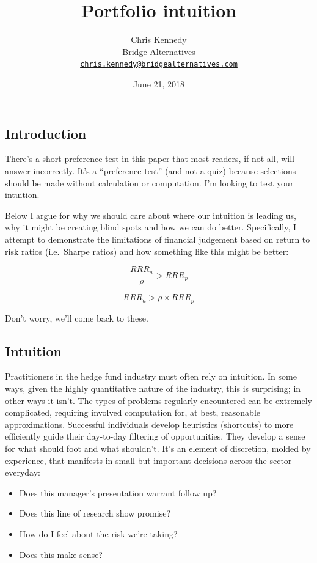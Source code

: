 \documentclass[]{article}
\title{Portfolio intuition}
\author{Chris Kennedy\\
Bridge Alternatives\\
\href{mailto:chris.kennedy@bridgealternatives.com}{\nolinkurl{chris.kennedy@bridgealternatives.com}}}
\date{June 21, 2018}
\providecommand{\tightlist}{%
  \setlength{\itemsep}{0pt}\setlength{\parskip}{0pt}}
\begin{document}
\maketitle

\hypertarget{introduction}{%
\subsection{Introduction}\label{introduction}}

There's a short preference test in this paper that most readers, if not
all, will answer incorrectly. It's a ``preference test'' (and not a
quiz) because selections should be made without calculation or
computation. I'm looking to test your intuition.

Below I argue for why we should care about where our intuition is
leading us, why it might be creating blind spots and how we can do
better. Specifically, I attempt to demonstrate the limitations of
financial judgement based on return to risk ratios (i.e.~Sharpe ratios)
and how something like this might be better:

\[
\frac{RRR_a}{\rho} > RRR_p
\]

\[
RRR_a > \rho \times RRR_p
\]

Don't worry, we'll come back to these.

\hypertarget{intuition}{%
\subsection{Intuition}\label{intuition}}

Practitioners in the hedge fund industry must often rely on intuition.
In some ways, given the highly quantitative nature of the industry, this
is surprising; in other ways it isn't. The types of problems regularly
encountered can be extremely complicated, requiring involved computation
for, at best, reasonable approximations. Successful individuals develop
heuristics (shortcuts) to more efficiently guide their day-to-day
filtering of opportunities. They develop a sense for what should foot
and what shouldn't. It's an element of discretion, molded by experience,
that manifests in small but important decisions across the sector
everyday:

\begin{itemize}
\tightlist
\item
  Does this manager's presentation warrant follow up?
\item
  Does this line of research show promise?
\item
  How do I feel about the risk we're taking?
\item
  Does this make sense?
\end{itemize}
\end{document}
